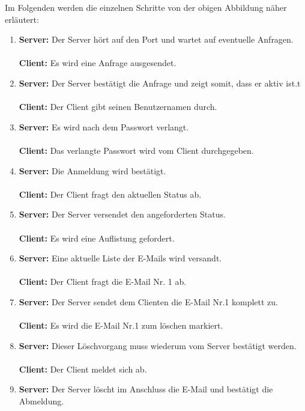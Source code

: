 \documentclass[12pt,a4paper]{report}
\begin{document}
\begin{onehalfspace}
Im Folgenden werden die einzelnen Schritte von der obigen Abbildung näher erläutert: 
\begin{enumerate}
\item \textbf{Server:} Der Server hört auf den Port und wartet auf eventuelle Anfragen.\\\\
\textbf{Client:} Es wird eine Anfrage ausgesendet. 
\item \textbf{Server:} Der Server bestätigt die Anfrage und zeigt somit, dass er aktiv ist.t\\\\
\textbf{Client:} Der Client gibt seinen Benutzernamen durch.
\item \textbf{Server:} Es wird nach dem Passwort verlangt.\\\\
\textbf{Client:} Das verlangte Passwort wird vom Client durchgegeben. 
\item \textbf{Server:} Die Anmeldung wird bestätigt.\\\\
\textbf{Client:} Der Client fragt den aktuellen Status ab.
\item \textbf{Server:} Der Server versendet den angeforderten Status.\\\\
\textbf{Client:} Es wird eine Auflistung gefordert. 
\item \textbf{Server:} Eine aktuelle Liste der E-Mails wird versandt. \\\\
\textbf{Client:} Der Client fragt die E-Mail Nr. 1 ab.
\item \textbf{Server:} Der Server sendet dem Clienten die E-Mail Nr.1 komplett zu. \\\\
\textbf{Client:} Es wird die E-Mail Nr.1 zum löschen markiert.
\item \textbf{Server:} Dieser Löschvorgang muss wiederum vom Server bestätigt werden.\\\\
\textbf{Client:} Der Client meldet sich ab. 
\item \textbf{Server:} Der Server löscht im Anschluss die E-Mail und bestätigt die Abmeldung. \\\\
\end{enumerate}


\end{onehalfspace}
\end{document}
